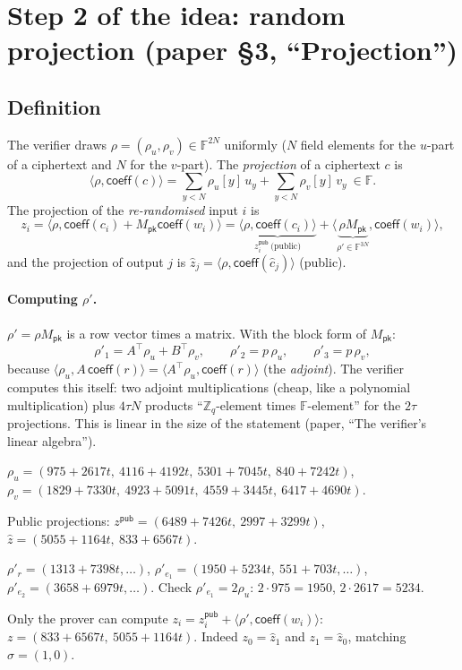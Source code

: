 \documentclass[11pt,a4paper]{article}
\newcommand{\Zq}{\mathbb{Z}_q}
\newcommand{\F}{\mathbb{F}}
\newcommand{\coeff}{\mathsf{coeff}}
\newcommand{\Mpk}{M_{\mathsf{pk}}}
\newcommand{\ip}[2]{\langle #1, #2\rangle}
\newcommand{\zh}{\hat{z}}
\newcommand{\ch}{\hat{c}}
\newcommand{\zpub}{z^{\mathsf{pub}}}
\theoremstyle{definition}
\theoremstyle{plain}
\begin{document}
\section{Step 2 of the idea: random projection (paper \S3, ``Projection'')}
\label{sec:projection}

\subsection{Definition}

The verifier draws $\rho=(\rho_u,\rho_v)\in\F^{2N}$ uniformly ($N$ field elements for the $u$-part of a
ciphertext and $N$ for the $v$-part). The \emph{projection} of a ciphertext $c$ is
\[
  \ip{\rho}{\coeff(c)}=\sum_{y<N}\rho_u[y]\,u_y+\sum_{y<N}\rho_v[y]\,v_y\ \in\F .
\]
The projection of the \emph{re-randomised} input $i$ is
\[
  z_i=\ip{\rho}{\coeff(c_i)+\Mpk\coeff(w_i)}
     =\underbrace{\ip{\rho}{\coeff(c_i)}}_{\zpub_i\ \text{(public)}}
     +\ip{\underbrace{\rho\Mpk}_{\rho'\in\F^{3N}}}{\coeff(w_i)} ,
\]
and the projection of output $j$ is $\zh_j=\ip{\rho}{\coeff(\ch_j)}$ (public).

\paragraph{Computing $\rho'$.} $\rho'=\rho\Mpk$ is a row vector times a matrix. With the block form
of $\Mpk$:
\[
  \rho'_1=A^{\top}\rho_u+B^{\top}\rho_v,\qquad \rho'_2=p\,\rho_u,\qquad \rho'_3=p\,\rho_v ,
\]
because $\ip{\rho_u}{A\,\coeff(r)}=\ip{A^{\top}\rho_u}{\coeff(r)}$ (the \emph{adjoint}). The verifier
computes this itself: two adjoint multiplications (cheap, like a polynomial multiplication) plus
$4\tau N$ products ``$\Zq$-element times $\F$-element'' for the $2\tau$ projections. This is linear in
the size of the statement (paper, ``The verifier's linear algebra'').

\begin{toyrun}[Projection]
$\rho_u=(975{+}2617t,\ 4116{+}4192t,\ 5301{+}7045t,\ 840{+}7242t)$,
$\rho_v=(1829{+}7330t,\ 4923{+}5091t,\ 4559{+}3445t,\ 6417{+}4690t)$.

Public projections: $\zpub=(6489{+}7426t,\ 2997{+}3299t)$, $\zh=(5055{+}1164t,\ 833{+}6567t)$.

$\rho'_r=(1313{+}7398t,\dots)$, $\rho'_{e_1}=(1950{+}5234t,\ 551{+}703t,\dots)$,
$\rho'_{e_2}=(3658{+}6979t,\dots)$. Check $\rho'_{e_1}=2\rho_u$: $2\cdot 975=1950$, $2\cdot 2617=5234$. \checkmark

Only the prover can compute $z_i=\zpub_i+\ip{\rho'}{\coeff(w_i)}$:
$z=(833{+}6567t,\ 5055{+}1164t)$. Indeed $z_0=\zh_1$ and $z_1=\zh_0$, matching $\sigma=(1,0)$.
\end{toyrun}
\end{document}
